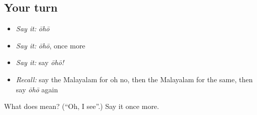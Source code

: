 \subsection*{Your turn}
\begin{itemize}
\raggedright
  \item \emph{Say it:} \emph{ōhō}
  \item \emph{Say it:} \emph{ōhō}, once more
  \item \emph{Say it:} say \emph{ōhō!}
  \item \emph{Recall:} say the Malayalam for oh no, then the Malayalam for the same, then say \emph{ōhō} again
\end{itemize}

\begin{tcolorbox}[breakable,colback=teal!4,colframe=teal!35!black,title={Before you move on}]
What does  mean? (\textquotedblleft{}Oh, I see\textquotedblright{}.) Say it once more.
\end{tcolorbox}
